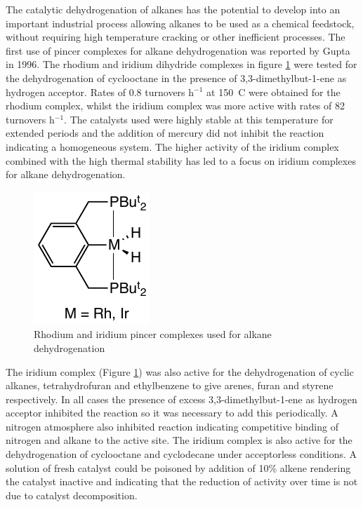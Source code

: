 The catalytic dehydrogenation of alkanes has the potential to develop into an important industrial process allowing alkanes to be used as a chemical feedstock, without requiring high temperature cracking or other inefficient processes.\cite{Choi2011}  The first use of pincer complexes for alkane dehydrogenation was reported by Gupta in 1996.\cite{Gupta1996}  The rhodium and iridium dihydride complexes in figure \ref{Dehydrogenationligands} were tested for the dehydrogenation of cyclooctane in the presence of 3,3-dimethylbut-1-ene as hydrogen acceptor.  Rates of 0.8 turnovers h$^{-1}$ at 150~\degrees C were obtained for the rhodium complex, whilst the iridium complex was more active with rates of 82 turnovers h$^{-1}$.\cite{Gupta1996}  The catalysts used were highly stable at this temperature for extended periods and the addition of mercury did not inhibit the reaction indicating a homogeneous system.\cite{Gupta1996}  The higher activity of the iridium complex combined with the high thermal stability has led to a focus on iridium complexes for alkane dehydrogenation.\cite{Choi2011}

\begin{figure}[ht]
\centering
\includegraphics[]{../Figures/Dehydrogenationligands.pdf}
\caption[Rhodium and iridium pincer complexes used for alkane dehydrogenation]{Rhodium and iridium pincer complexes used for alkane dehydrogenation}
\label{Dehydrogenationligands}
\end{figure}

The iridium complex (Figure \ref{Dehydrogenationligands}) was also active for the dehydrogenation of cyclic alkanes, tetrahydrofuran and ethylbenzene to give arenes, furan and styrene respectively.\cite{Gupta1997, Gupta1997b}  In all cases the presence of excess 3,3-dimethylbut-1-ene as hydrogen acceptor inhibited the reaction so it was necessary to add this periodically.  A nitrogen atmosphere also inhibited reaction indicating competitive binding of nitrogen and alkane to the active site.\cite{Gupta1996, Gupta1997, Gupta1997b}  The iridium complex is also active for the dehydrogenation of cyclooctane and cyclodecane under acceptorless conditions.\cite{Xu1997}  A solution of fresh catalyst could be poisoned by addition of 10\% alkene rendering the catalyst inactive and indicating that the reduction of activity over time is not due to catalyst decomposition.\cite{Xu1997}


